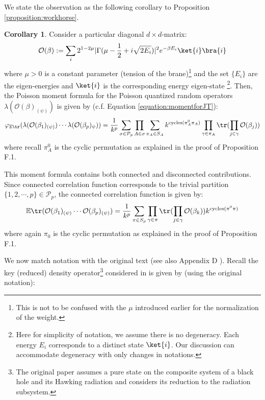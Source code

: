 \documentclass[a4paper,11pt]{article}
\theoremstyle{definition}
\numberwithin{equation}{section}
\newtheorem{corollary}[lemma]{Corollary}
\begin{document}
We state the observation as the following corollary to Proposition \ref{proposition:workhorse}.
\begin{corollary}
    Consider a particular diagonal $d\times d$-matrix:
    \begin{equation}
        \mathcal{O}(\beta) := \sum_i 2^{1 - 2\mu}|\Gamma(\mu - \frac{1}{2} + i\sqrt{2E_i})|^2e^{-\beta E_i}\ket{i}\bra{i}
    \end{equation}
    where $\mu > 0$ is a constant parameter (tension of the brane)\footnote{This is not to be confused with the $\mu$ introduced earlier for the normalization of the weight.} and the set $\{E_i\}$ are the eigen-energies and $\ket{i}$ is the corresponding energy eigen-state \footnote{Here for simplicity of notation, we assume there is no degeneracy. Each energy $E_i$ corresponds to a distinct state $\ket{i}$. Our discussion can accommodate degeneracy with only changes in notations.}. Then, the Poisson moment formula for the Poisson quantized random operators $\lambda(\mathcal{O}(\beta)_{(\psi)})$ is given by (c.f. Equation \ref{equation:momentforJT}):
    \begin{equation}
        \varphi_{\mathbb{E}\tr}(\lambda(\mathcal{O}(\beta_1)_{(\psi)})\cdots\lambda(\mathcal{O}(\beta_p)_{\psi})) = \frac{1}{k^p}\sum_{\sigma\in \mathcal{P}_p}\prod_{A\in\sigma}\sum_{\pi_A\in S_A}k^{\text{cycles}(\pi_A^0\pi_A)}\prod_{\gamma\in \pi_A}\tr(\prod_{j\in \gamma}\mathcal{O}(\beta_j))
    \end{equation}
    where recall $\pi^0_A$ is the cyclic permutation as explained in the proof of Proposition F.1.
    
    This moment formula contains both connected and disconnected contributions. Since connected correlation function corresponds to the trivial partition $\{1,2,\cdots,p\}\in\mathcal{P}_p$, the connected correlation function is given by:
    \begin{equation}
        \mathbb{E}\tr(\mathcal{O}(\beta_1)_{(\psi)}\cdots\mathcal{O}(\beta_p)_{(\psi)}) =\frac{1}{k^p}\sum_{\pi\in S_p}\prod_{\gamma\in \pi}\tr(\prod_{j\in\gamma}\mathcal{O}(\beta_k))k^{\text{cycles}(\pi^0\pi)}
    \end{equation}
    where again $\pi_0$ is the cyclic permutation as explained in the proof of Proposition F.1.
\end{corollary}
We now match notation with the original text (see also Appendix D \cite{Penington:2019kki}).  Recall the key (reduced) density operator\footnote{The original paper assumes a pure state on the composite system of a black hole and its Hawking radiation and considers its reduction to the radiation subsystem.} considered in \cite{Penington:2019kki} is given by (using the original notation):
\end{document}
